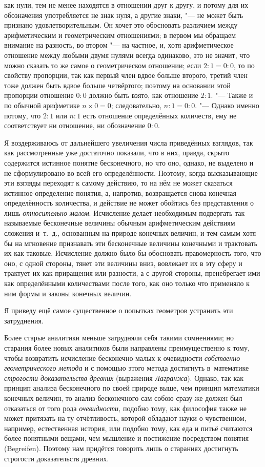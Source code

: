 как нули, тем не менее находятся в отношении друг к другу, и потому для их
обозначения употребляется не знак нуля, а другие знаки, "--- не может быть
признано удовлетворительным. Он хочет это обосновать различием между
арифметическим и геометрическим отношениями; в первом мы обращаем внимание на
разность, во втором "--- на частное, и, хотя арифметическое отношение между
любыми двумя нулями всегда одинаково, это не значит, что можно сказать то же
самое о геометрическом отношении; если $2:1=0:0$, то по свойству
пропорции, так как первый член вдвое больше второго, третий член тоже должен
быть вдвое больше четвёртого; поэтому на основании этой пропорции отношение
$0:0$ должно быть взято, как отношение $2:1$. "--- Также и по обычной
арифметике $n\times 0=0$; следовательно, $n:1=0:0$. "--- Однако именно
потому, что $2:1$ или $n:1$ есть отношение определённых количеств, ему не
соответствует ни отношение, ни обозначение $0:0$.

Я воздерживаюсь от дальнейшего увеличения числа приведённых взглядов, так как
рассмотренные уже достаточно показали, что в них, правда, скрыто содержится
истинное понятие бесконечного, но что оно, однако, не выделено и не
сформулировано во всей его определённости. Поэтому, когда высказывающие эти
взгляды переходят к самому действию, то на нём не может сказаться истинное
определение понятия, а, напротив, возвращается снова конечная определённость
количества, и действие не может обойтись без представления о лишь
{\em относительно малом}. Исчисление делает необходимым подвергать так
называемые бесконечные величины обычным арифметическим действиям сложения
и~т.~д., основанным на природе конечных величин, и тем самым хотя бы на
мгновение признавать эти бесконечные величины конечными и трактовать их как
таковые. Исчисление должно было бы обосновать правомерность того, что оно, с
одной стороны, тянет эти величины вниз, вовлекает их в эту сферу и трактует их
как приращения или разности, а с другой стороны, пренебрегает ими как
определёнными количествами после того, как оно только что применяло к ним формы
и законы конечных величин.

Я приведу ещё самое существенное о попытках геометров устранить эти
затруднения.

Более старые аналитики меньше затрудняли себя такими сомнениями; но старания
более новых аналитиков были направлены преимущественно к тому, чтобы возвратить
исчисление бесконечно малых к очевидности
{\em собственно геометрического метода} и с помощью этого метода достигнуть
в~математике {\em строгости доказательств древних} (выражения {\em Лагранжа}).
Однако, так как принцип анализа бесконечного по своей природе выше, чем принцип
математики конечных величин, то анализ бесконечного сам собою сразу же должен
был отказаться от того рода {\em очевидности,} подобно тому, как философия
также не может притязать на ту отчётливость, которой обладают науки о
чувственном, например, естественная история, или подобно тому, как еда и питьё
считаются более понятными вещами, чем мышление и постижение посредством понятия
(Be\-grei\-fen). Поэтому нам придётся говорить лишь о стараниях достигнуть
строгости доказательств древних.


